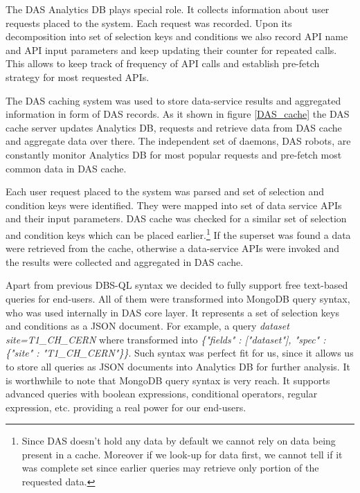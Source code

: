 \documentclass[a4paper]{jpconf}
\begin{document}
The DAS Analytics DB plays special role. It collects information
about user requests placed to the system. Each request was recorded. Upon its
decomposition into set of selection keys and conditions we also record
API name and API input parameters and keep updating their counter for repeated
calls. This allows to keep track of frequency of API calls and establish pre-fetch
strategy for most requested APIs.

The DAS caching system was used to store data-service results and aggregated
information in form of DAS records. As it shown in figure \ref{DAS_cache} 
the DAS cache server updates Analytics DB, requests and retrieve data from DAS cache
and aggregate data over there. The independent set of daemons, DAS robots, are
constantly monitor Analytics DB for most popular requests and pre-fetch most
common data in DAS cache.

Each user request placed to the system was parsed and set of selection
and condition keys were identified. They were mapped into set of
data service APIs and their input parameters. DAS
cache was checked for a similar set of selection and condition
keys which can be placed earlier.\footnote{Since DAS doesn't hold
any data by default we cannot rely on data being present in a cache.
Moreover if we look-up for data first, we cannot tell if it was complete
set since earlier queries may retrieve only portion of the requested data.}
If the superset was found a data were
retrieved from the cache, otherwise a data-service APIs were
invoked and the results were collected and aggregated in DAS cache.


Apart from previous DBS-QL syntax we decided to fully support free text-based queries for end-users.
All of them were transformed into MongoDB query syntax, who was used internally in
DAS core layer. It represents a set of selection keys and conditions as a JSON document.
For example, a query
{\it dataset site=T1\_CH\_CERN}
where transformed into 
{\it \{"fields" : ["dataset"], "spec" : \{"site" : "T1\_CH\_CERN"\}\}}.
Such syntax was perfect fit for us, since it allows us to store all queries
as JSON documents into Analytics DB for further analysis. It is worthwhile to note that
MongoDB query syntax is very reach. It supports advanced queries with 
boolean expressions, conditional operators, regular expression, etc. providing
a real power for our end-users.
\end{document}
